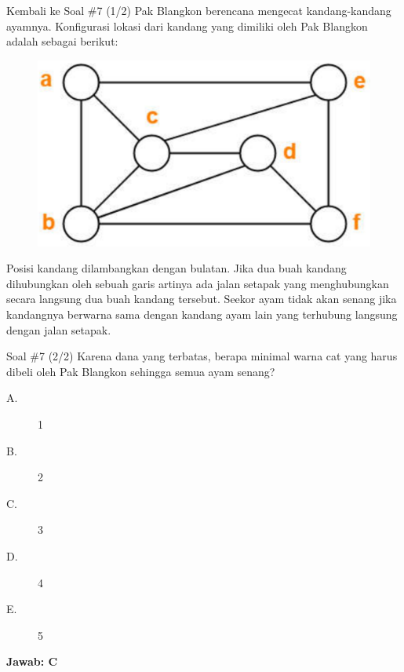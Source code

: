 \documentclass[english,t]{beamer}
\begin{document}
	\begin{frame}{Kembali ke Soal \#7 (1/2)}
	Pak Blangkon berencana mengecat kandang-kandang ayamnya. Konfigurasi lokasi dari kandang yang dimiliki oleh Pak Blangkon adalah sebagai berikut:
	\begin{figure}[!ht]
		\centering
		\includegraphics[scale=.15]{images/map-coloring}
	\end{figure}
	Posisi kandang dilambangkan dengan bulatan. Jika dua buah kandang dihubungkan oleh sebuah garis artinya ada jalan setapak yang menghubungkan secara langsung dua buah kandang tersebut. Seekor ayam tidak akan senang jika kandangnya berwarna sama dengan kandang ayam lain yang terhubung langsung dengan jalan setapak. 		
\end{frame}

\begin{frame}{Soal \#7 (2/2)}
	Karena dana yang terbatas, berapa minimal warna cat yang harus dibeli oleh Pak Blangkon sehingga semua ayam senang?
	\begin{description}
		\item[A.] 1
		\item[B.] 2
		\item[C.] 3
		\item[D.] 4
		\item[E.] 5
	\end{description}		
	\pause \textbf{Jawab: C}	
\end{frame}
\end{document}
